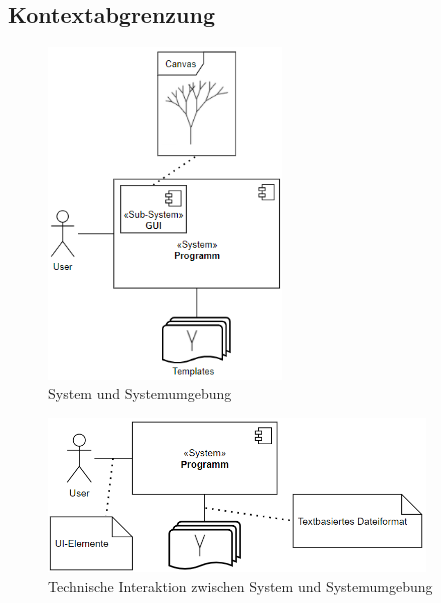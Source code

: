 \documentclass[11pt]{article}
\begin{document}
    \subsection{Kontextabgrenzung}
    \begin{figure}[H]
        \centering
        \includegraphics[width=6.2cm]{../images/Fachlicher_Kontext.PNG}
        \caption{System und Systemumgebung}
    \end{figure}
    \begin{figure}[H]
        \centering
        \includegraphics[width=10cm]{../images/Technischer_Kontext.PNG}
        \caption{Technische Interaktion zwischen System und Systemumgebung}
    \end{figure}

    \newpage
\end{document}
